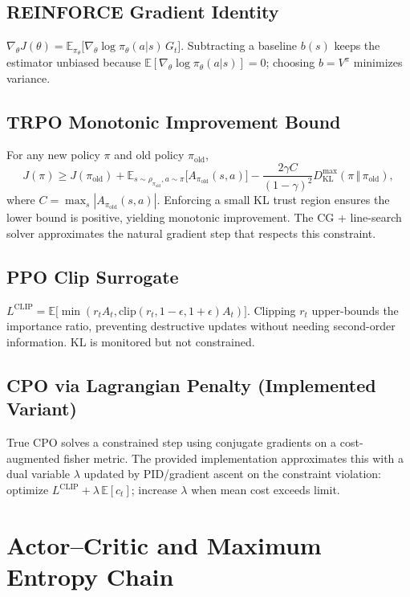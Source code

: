 \documentclass[11pt]{article}
\newcommand{\E}{\mathbb{E}}
\newcommand{\1}{\mathbf{1}}
\begin{document}
\subsection{REINFORCE Gradient Identity}
$\nabla_\theta J(\theta)=\E_{\pi_\theta}\bigl[\nabla_\theta \log \pi_\theta(a|s)\, G_t\bigr]$. Subtracting a baseline $b(s)$ keeps the estimator unbiased because $\E[\nabla_\theta\log\pi_\theta(a|s)]=0$; choosing $b=V^{\pi}$ minimizes variance.

\subsection{TRPO Monotonic Improvement Bound}
For any new policy $\pi$ and old policy $\pi_\text{old}$,
\begin{equation}
J(\pi) \ge J(\pi_\text{old}) + \E_{s\sim\rho_{\pi_\text{old}},a\sim\pi}\bigl[A_{\pi_\text{old}}(s,a)\bigr] - \frac{2\gamma C}{(1-\gamma)^2} D_{\mathrm{KL}}^{\max}(\pi\,\Vert\,\pi_\text{old}),
\end{equation}
where $C=\max_s |A_{\pi_\text{old}}(s,a)|$. Enforcing a small KL trust region ensures the lower bound is positive, yielding monotonic improvement. The CG + line-search solver approximates the natural gradient step that respects this constraint.

\subsection{PPO Clip Surrogate}
$L^{\text{CLIP}}=\E\bigl[\min(r_t A_t, \text{clip}(r_t,1-\epsilon,1+\epsilon)A_t)\bigr]$. Clipping $r_t$ upper-bounds the importance ratio, preventing destructive updates without needing second-order information. KL is monitored but not constrained.

\subsection{CPO via Lagrangian Penalty (Implemented Variant)}
True CPO solves a constrained step using conjugate gradients on a cost-augmented fisher metric. The provided implementation approximates this with a dual variable $\lambda$ updated by PID/gradient ascent on the constraint violation: optimize $L^{\text{CLIP}} + \lambda\,\E[c_t]$; increase $\lambda$ when mean cost exceeds limit.

\section{Actor--Critic and Maximum Entropy Chain}
\end{document}
